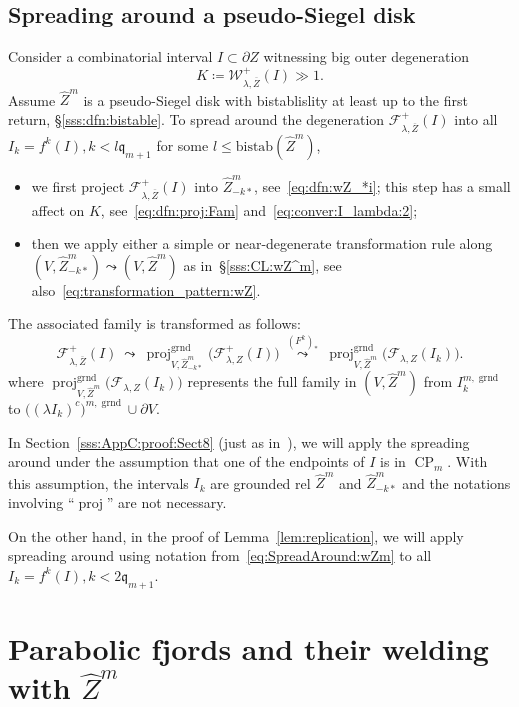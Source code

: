\documentclass{amsart}
\newcommand{\proj}{{\operatorname{proj}}}
\newcommand{\1}{{\mathbb 1 }}
\newcommand{\Fam}{{\mathcal F}}
\newcommand{\Width}{{\mathcal W}}
\newcommand{\bistab}{{\text{bistab}}}
\newcommand{\wZ}{{\widehat Z}}
\newcommand{\qq}{\mathfrak{q}}
\newcommand{\grnd}{{\operatorname{grnd}}}
\theoremstyle{remark}
\numberwithin{equation}{section}
\theoremstyle{definition}
\newcommand{\CP}{{\operatorname{CP}}}
\begin{document}
\subsection{Spreading around a pseudo-Siegel disk}\label{sss:SpreadAround:rel:wZ} 
Consider a combinatorial interval $I\subset \partial Z$ witnessing big outer degeneration 
\[ K\coloneqq \Width^+_{\lambda, \overline Z}(I)\gg 1.\]
Assume $\wZ^m$ is a pseudo-Siegel disk with bistablislity at least up to the first return, \S\ref{sss:dfn:bistable}. To spread around the degeneration $\Fam^+_{\lambda, \overline Z}(I)$ into all $I_k=f^k(I), k <l\qq_{m+1}$ for some $l \leq \bistab(\wZ^m)$,  
\begin{itemize}
    \item we first project $\Fam^+_{\lambda, \overline Z}(I)$ into $\wZ^m_{-k*}$, see~\eqref{eq:dfn:wZ_*i}; this step has a small affect on $K$, see~\eqref{eq:dfn:proj:Fam} and~\eqref{eq:conver:I_lambda:2};
    \item then we apply either a simple or near-degenerate transformation rule along $(V, \wZ^m_{-k*})\leadsto (V, \wZ^m)$ as in~\S\ref{sss:CL:wZ^m}, see also~\eqref{eq:transformation_pattern:wZ}.
\end{itemize}
The associated family is transformed as follows:
\begin{equation}
    \label{eq:SpreadAround:wZm}  \Fam^+_{\lambda, \overline Z}(I)\ \leadsto \ \proj^\grnd_{V,\wZ^m_{-k*}} \big(\Fam^+_{\lambda, Z}(I)\big) \ \overset{(F^k)_*}{\leadsto} \ \proj^\grnd_{V,\wZ^m} \big(\Fam_{\lambda, Z}(I_k)\big).
\end{equation}
where $\proj^\grnd_{V,\wZ^m} \big(\Fam_{\lambda, Z}(I_k)\big)$ represents the full family in $(V,\wZ^m)$ from $I_k^{m,\grnd}$ to $\big((\lambda I_k)^c\big)^{m,\grnd}\cup \partial V.$ 


In Section~\ref{sss:AppC:proof:Sect8} (just as in~\cite[\S8.2]{DL22}), we will apply the spreading around under the assumption that one of the endpoints of $I$ is in $\CP_m$. With this assumption, the intervals $I_k$ are grounded rel $\wZ^m$ and $\wZ^m_{-k*}$ and the notations involving ``$\proj$'' are not necessary.

On the other hand, in the proof of Lemma~\ref{lem:replication}, we will apply spreading around using notation from~\eqref{eq:SpreadAround:wZm} to all $I_k=f^k(I), k <2\qq_{m+1}$.



\section{Parabolic fjords and their welding with $\wZ^m$} \label{sec:parabolicfjords}
\end{document}
